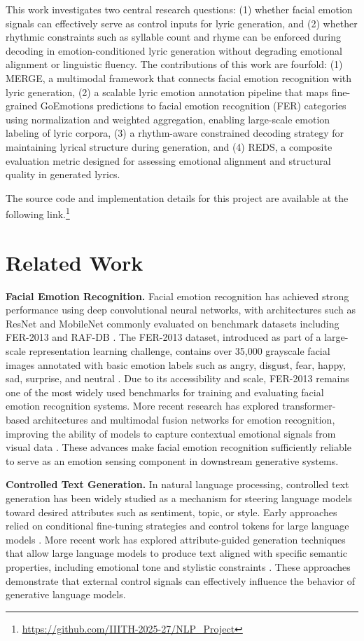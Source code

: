 \documentclass[11pt]{article}
\begin{document}
This work investigates two central research questions: (1) whether facial emotion signals can effectively serve as control inputs for lyric generation, and (2) whether rhythmic constraints such as syllable count and rhyme can be enforced during decoding in emotion-conditioned lyric generation without degrading emotional alignment or linguistic fluency.
The contributions of this work are fourfold: 
(1) MERGE, a multimodal framework that connects facial emotion recognition with lyric generation, 
(2) a scalable lyric emotion annotation pipeline that maps fine-grained GoEmotions predictions to facial emotion recognition (FER) categories using normalization and weighted aggregation, enabling large-scale emotion labeling of lyric corpora, 
(3) a rhythm-aware constrained decoding strategy for maintaining lyrical structure during generation, and 
(4) REDS, a composite evaluation metric designed for assessing emotional alignment and structural quality in generated lyrics.

The source code and implementation details for this project are available at the following link.\footnote{\url{https://github.com/IIITH-2025-27/NLP_Project}}
\section{Related Work}

\textbf{Facial Emotion Recognition.}
Facial emotion recognition has achieved strong performance using deep convolutional neural networks, with architectures such as ResNet and MobileNet commonly evaluated on benchmark datasets including FER-2013 and RAF-DB \cite{goodfellow2013challenges, li2017reliable}. The FER-2013 dataset, introduced as part of a large-scale representation learning challenge, contains over 35,000 grayscale facial images annotated with basic emotion labels such as angry, disgust, fear, happy, sad, surprise, and neutral \cite{goodfellow2013challenges}. Due to its accessibility and scale, FER-2013 remains one of the most widely used benchmarks for training and evaluating facial emotion recognition systems. More recent research has explored transformer-based architectures and multimodal fusion networks for emotion recognition, improving the ability of models to capture contextual emotional signals from visual data \cite{zhang2023multimodal}. These advances make facial emotion recognition sufficiently reliable to serve as an emotion sensing component in downstream generative systems.

\textbf{Controlled Text Generation.}
In natural language processing, controlled text generation has been widely studied as a mechanism for steering language models toward desired attributes such as sentiment, topic, or style. Early approaches relied on conditional fine-tuning strategies and control tokens for large language models \cite{radford2019language}. More recent work has explored attribute-guided generation techniques that allow large language models to produce text aligned with specific semantic properties, including emotional tone and stylistic constraints \cite{hu2023attribute}. These approaches demonstrate that external control signals can effectively influence the behavior of generative language models.
\end{document}

